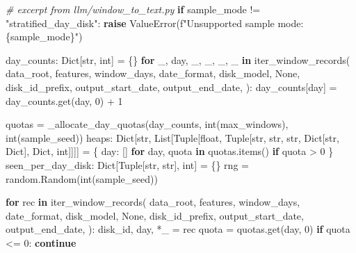 \documentclass[
  11pt,
  a4paper]{article}
\newenvironment{Shaded}{}{}
\newcommand{\BuiltInTok}[1]{#1}
\newcommand{\CommentTok}[1]{\textcolor[rgb]{0.38,0.63,0.69}{\textit{#1}}}
\newcommand{\ControlFlowTok}[1]{\textcolor[rgb]{0.00,0.44,0.13}{\textbf{#1}}}
\newcommand{\DecValTok}[1]{\textcolor[rgb]{0.25,0.63,0.44}{#1}}
\newcommand{\KeywordTok}[1]{\textcolor[rgb]{0.00,0.44,0.13}{\textbf{#1}}}
\newcommand{\NormalTok}[1]{#1}
\newcommand{\OperatorTok}[1]{\textcolor[rgb]{0.40,0.40,0.40}{#1}}
\newcommand{\PreprocessorTok}[1]{\textcolor[rgb]{0.74,0.48,0.00}{#1}}
\newcommand{\SpecialCharTok}[1]{\textcolor[rgb]{0.25,0.44,0.63}{#1}}
\newcommand{\SpecialStringTok}[1]{\textcolor[rgb]{0.73,0.40,0.53}{#1}}
\newcommand{\StringTok}[1]{\textcolor[rgb]{0.25,0.44,0.63}{#1}}
\newcommand{\VariableTok}[1]{\textcolor[rgb]{0.10,0.09,0.49}{#1}}
\begin{document}
\begin{Shaded}
\begin{Highlighting}[]
\CommentTok{\# excerpt from llm/window\_to\_text.py}
\ControlFlowTok{if}\NormalTok{ sample\_mode }\OperatorTok{!=} \StringTok{"stratified\_day\_disk"}\NormalTok{:}
    \ControlFlowTok{raise} \PreprocessorTok{ValueError}\NormalTok{(}\SpecialStringTok{f"Unsupported sample mode: }\SpecialCharTok{\{}\NormalTok{sample\_mode}\SpecialCharTok{\}}\SpecialStringTok{"}\NormalTok{)}

\NormalTok{day\_counts: Dict[}\BuiltInTok{str}\NormalTok{, }\BuiltInTok{int}\NormalTok{] }\OperatorTok{=}\NormalTok{ \{\}}
\ControlFlowTok{for}\NormalTok{ \_, day, \_, \_, \_, \_ }\KeywordTok{in}\NormalTok{ iter\_window\_records(}
\NormalTok{    data\_root,}
\NormalTok{    features,}
\NormalTok{    window\_days,}
\NormalTok{    date\_format,}
\NormalTok{    disk\_model,}
    \VariableTok{None}\NormalTok{,}
\NormalTok{    disk\_id\_prefix,}
\NormalTok{    output\_start\_date,}
\NormalTok{    output\_end\_date,}
\NormalTok{):}
\NormalTok{    day\_counts[day] }\OperatorTok{=}\NormalTok{ day\_counts.get(day, }\DecValTok{0}\NormalTok{) }\OperatorTok{+} \DecValTok{1}

\NormalTok{quotas }\OperatorTok{=}\NormalTok{ \_allocate\_day\_quotas(day\_counts, }\BuiltInTok{int}\NormalTok{(max\_windows), }\BuiltInTok{int}\NormalTok{(sample\_seed))}
\NormalTok{heaps: Dict[}\BuiltInTok{str}\NormalTok{, List[Tuple[}\BuiltInTok{float}\NormalTok{, Tuple[}\BuiltInTok{str}\NormalTok{, }\BuiltInTok{str}\NormalTok{, }\BuiltInTok{str}\NormalTok{, Dict[}\BuiltInTok{str}\NormalTok{, Dict], Dict, }\BuiltInTok{int}\NormalTok{]]]] }\OperatorTok{=}\NormalTok{ \{}
\NormalTok{    day: [] }\ControlFlowTok{for}\NormalTok{ day, quota }\KeywordTok{in}\NormalTok{ quotas.items() }\ControlFlowTok{if}\NormalTok{ quota }\OperatorTok{\textgreater{}} \DecValTok{0}
\NormalTok{\}}
\NormalTok{seen\_per\_day\_disk: Dict[Tuple[}\BuiltInTok{str}\NormalTok{, }\BuiltInTok{str}\NormalTok{], }\BuiltInTok{int}\NormalTok{] }\OperatorTok{=}\NormalTok{ \{\}}
\NormalTok{rng }\OperatorTok{=}\NormalTok{ random.Random(}\BuiltInTok{int}\NormalTok{(sample\_seed))}

\ControlFlowTok{for}\NormalTok{ rec }\KeywordTok{in}\NormalTok{ iter\_window\_records(}
\NormalTok{    data\_root,}
\NormalTok{    features,}
\NormalTok{    window\_days,}
\NormalTok{    date\_format,}
\NormalTok{    disk\_model,}
    \VariableTok{None}\NormalTok{,}
\NormalTok{    disk\_id\_prefix,}
\NormalTok{    output\_start\_date,}
\NormalTok{    output\_end\_date,}
\NormalTok{):}
\NormalTok{    disk\_id, day, }\OperatorTok{*}\NormalTok{\_ }\OperatorTok{=}\NormalTok{ rec}
\NormalTok{    quota }\OperatorTok{=}\NormalTok{ quotas.get(day, }\DecValTok{0}\NormalTok{)}
    \ControlFlowTok{if}\NormalTok{ quota }\OperatorTok{\textless{}=} \DecValTok{0}\NormalTok{:}
        \ControlFlowTok{continue}


\end{Highlighting}
\end{Shaded}
\end{document}
